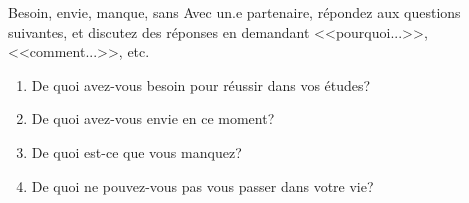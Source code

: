 \begin{frame}{Besoin, envie, manque, sans}
  Avec un.e partenaire, répondez aux questions suivantes, et discutez des réponses en demandant <<pourquoi...>>, <<comment...>>, etc.
  \begin{enumerate}
    \item De quoi avez-vous \alert{besoin} pour réussir dans vos études?
    \item De quoi avez-vous \alert{envie} en ce moment?
    \item De quoi est-ce que vous \alert{manquez}?
    \item De quoi ne pouvez-vous pas \alert{vous passer} dans votre vie?
  \end{enumerate}
\end{frame}
